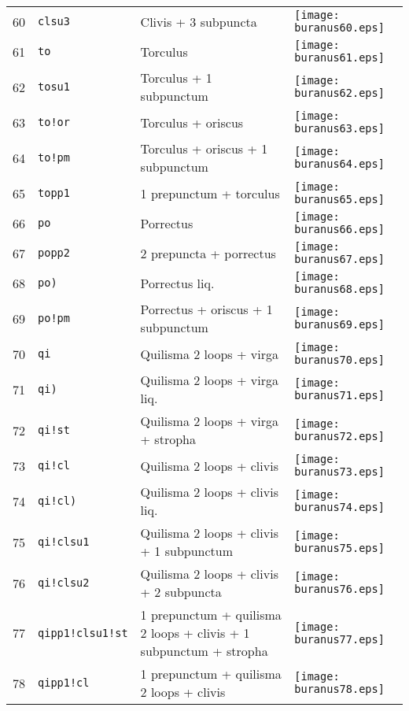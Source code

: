 \documentclass{scrarticle}
\begin{document}
\begin{longtable}{l|l|l|l}
60 & \texttt{clsu3} & Clivis + 3 subpuncta & \texttt{[image: buranus60.eps]} \\
61 & \texttt{to} & Torculus & \texttt{[image: buranus61.eps]} \\
62 & \texttt{tosu1} & Torculus + 1 subpunctum & \texttt{[image: buranus62.eps]} \\
63 & \texttt{to!or} & Torculus + oriscus & \texttt{[image: buranus63.eps]} \\
64 & \texttt{to!pm} & Torculus + oriscus + 1 subpunctum & \texttt{[image: buranus64.eps]} \\
65 & \texttt{topp1} & 1 prepunctum + torculus & \texttt{[image: buranus65.eps]} \\
66 & \texttt{po} & Porrectus & \texttt{[image: buranus66.eps]} \\
67 & \texttt{popp2} & 2 prepuncta + porrectus & \texttt{[image: buranus67.eps]} \\
68 & \texttt{po)} & Porrectus liq. & \texttt{[image: buranus68.eps]} \\
69 & \texttt{po!pm} & Porrectus + oriscus + 1 subpunctum & \texttt{[image: buranus69.eps]} \\
70 & \texttt{qi} & Quilisma 2 loops + virga & \texttt{[image: buranus70.eps]} \\
71 & \texttt{qi)} & Quilisma 2 loops + virga liq. & \texttt{[image: buranus71.eps]} \\
72 & \texttt{qi!st} & Quilisma 2 loops + virga + stropha & \texttt{[image: buranus72.eps]} \\
73 & \texttt{qi!cl} & Quilisma 2 loops + clivis & \texttt{[image: buranus73.eps]} \\
74 & \texttt{qi!cl)} & Quilisma 2 loops + clivis liq. & \texttt{[image: buranus74.eps]} \\
75 & \texttt{qi!clsu1} & Quilisma 2 loops + clivis + 1 subpunctum & \texttt{[image: buranus75.eps]} \\
76 & \texttt{qi!clsu2} & Quilisma 2 loops + clivis + 2 subpuncta & \texttt{[image: buranus76.eps]} \\
77 & \texttt{qipp1!clsu1!st} & 1 prepunctum + quilisma 2 loops + clivis + 1 subpunctum + stropha & \texttt{[image: buranus77.eps]} \\
78 & \texttt{qipp1!cl} & 1 prepunctum + quilisma 2 loops + clivis & \texttt{[image: buranus78.eps]} \\

\end{longtable}
\end{document}
